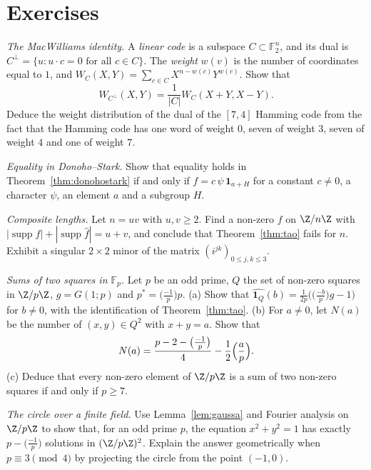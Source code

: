 \section{Exercises}

\begin{exercise}[$\star\star$]\label{ex:macwilliams}
\emph{The MacWilliams identity.} A \emph{linear code} is a subspace $C\subset\mathbb F_2^n$, and its dual is $C^\perp=\{u:u\cdot c=0\text{ for all }c\in C\}$. The
\emph{weight} $w(v)$ is the number of coordinates equal to $1$, and $W_C(X,Y)=\sum_{c\in C}X^{n-w(c)}Y^{w(c)}$. Show that
\[W_{C^\perp}(X,Y)=\frac1{|C|}W_C(X+Y,X-Y).\]
Deduce the weight distribution of the dual of the $[7,4]$ Hamming code from the fact that the Hamming code has one word of weight $0$, seven
of weight $3$, seven of weight $4$ and one of weight $7$.
\end{exercise}

\begin{exercise}[$\star\star$]\label{ex:dsequality}
\emph{Equality in Donoho--Stark.} Show that equality holds in Theorem~\ref{thm:donohostark} if and only if $f=c\,\psi\,\mathbf 1_{a+H}$ for a constant $c\ne0$, a
character $\psi$, an element $a$ and a subgroup $H$.
\end{exercise}

\begin{exercise}[$\star$]\label{ex:composite}
\emph{Composite lengths.} Let $n=uv$ with $u,v\ge2$. Find a non-zero $f$ on $\Z/n\Z$ with $|\operatorname{supp}f|+|\operatorname{supp}\hat f|=u+v$, and conclude that
Theorem~\ref{thm:tao} fails for $n$. Exhibit a singular $2\times2$ minor of the matrix $(i^{jk})_{0\le j,k\le3}$.
\end{exercise}

\begin{exercise}[$\star\star$]\label{ex:qrsums}
\emph{Sums of two squares in $\mathbb F_p$.} Let $p$ be an odd prime, $Q$ the set of non-zero squares in $\Z/p\Z$, $g=G(1;p)$ and $p^*=\bigl(\frac{-1}p\bigr)p$. (a) Show that
$\widehat{\mathbf 1_Q}(b)=\frac1{2p}\bigl(\bigl(\frac{-b}p\bigr)g-1\bigr)$ for $b\ne0$, with the identification of Theorem~\ref{thm:tao}. (b) For $a\ne0$, let $N(a)$ be the number of
$(x,y)\in Q^2$ with $x+y=a$. Show that
\[N(a)=\frac{p-2-\bigl(\frac{-1}p\bigr)}4-\frac12\Bigl(\frac ap\Bigr).\]
(c) Deduce that every non-zero element of $\Z/p\Z$ is a sum of two non-zero squares if and only if $p\ge7$.
\end{exercise}

\begin{exercise}[$\star\star$]\label{ex:circlefp}
\emph{The circle over a finite field.} Use Lemma~\ref{lem:gaussa} and Fourier analysis on $\Z/p\Z$ to show that, for an odd prime $p$, the
equation $x^2+y^2=1$ has exactly $p-\bigl(\frac{-1}p\bigr)$ solutions in $(\Z/p\Z)^2$. Explain the answer geometrically when $p\equiv3\pmod4$ by projecting the
circle from the point $(-1,0)$.
\end{exercise}

